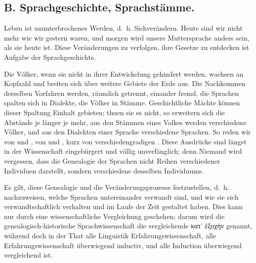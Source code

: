 \subsection*{B. Sprachgeschichte, Sprachstämme.}

Leben ist ununterbrochenes Werden, d.~h. Sichverändern. Heute sind wir nicht mehr wie wir gestern waren, und morgen wird unsere Muttersprache anders sein, als sie heute ist. Diese Veränderungen zu verfolgen, ihre Gesetze zu entdecken ist Aufgabe der Sprachgeschichte.

Die Völker, wenn sie nicht in ihrer Entwickelung gehindert werden, wachsen an Kopfzahl und breiten sich über weitere Gebiete der Erde aus. Die Nachkommen derselben Vorfahren werden, räumlich getrennt, einander fremd, die Sprachen spalten sich in Dialekte, die Völker in \label{fp.11} Stämme. Geschichtliche Mächte können dieser Spaltung Einhalt gebieten; thuen sie es nicht, so erweitern sich die Abstände je länger je mehr, aus den Stämmen eines Volkes werden verschiedene Völker, und aus den Dialekten einer Sprache verschiedene Sprachen. So reden wir von  und , von  und , kurz von verschiedengradigen . Diese Ausdrücke sind längst in der Wissenschaft eingebürgert und völlig unverfänglich; denn Niemand wird vergessen, dass die Genealogie der Sprachen nicht Reihen verschiedener Individuen darstellt, sondern verschiedene  desselben Individuums.

Es gilt, diese Genealogie und die Veränderungsprozesse festzustellen, d.~h. nachzuweisen, welche Sprachen untereinander verwandt sind, und wie sie sich verwandtschaftlich  verhalten und im Laufe der Zeit gestaltet haben. \label{sp.10} Dies kann nur durch eine wissenschaftliche Vergleichung geschehen; darum wird die genealogisch-historische Sprachwissenschaft die vergleichende κατ’ ἐξοχήν genannt, während doch in der That alle Linguistik Erfahrungswissenschaft, alle Erfahrungswissenschaft überwiegend inductiv, und alle Induction überwiegend vergleichend ist.

